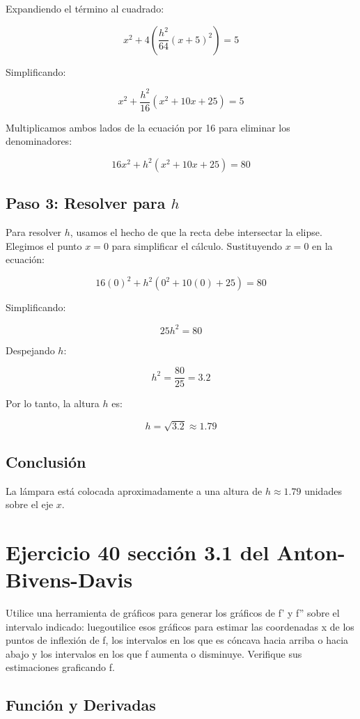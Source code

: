 \documentclass[11pt,letterpaper]{article}
\begin{document}
Expandiendo el término al cuadrado:

\[
x^2 + 4\left( \frac{h^2}{64}(x + 5)^2 \right) = 5
\]

Simplificando:

\[
x^2 + \frac{h^2}{16}(x^2 + 10x + 25) = 5
\]

Multiplicamos ambos lados de la ecuación por 16 para eliminar los denominadores:

\[
16x^2 + h^2(x^2 + 10x + 25) = 80
\]

\subsection*{Paso 3: Resolver para \(h\)}

Para resolver \(h\), usamos el hecho de que la recta debe intersectar la elipse. Elegimos el punto \(x = 0\) para simplificar el cálculo. Sustituyendo \(x = 0\) en la ecuación:

\[
16(0)^2 + h^2(0^2 + 10(0) + 25) = 80
\]

Simplificando:

\[
25h^2 = 80
\]

Despejando \(h\):

\[
h^2 = \frac{80}{25} = 3.2
\]

Por lo tanto, la altura \(h\) es:

\[
h = \sqrt{3.2} \approx 1.79
\]

\subsection*{Conclusión}

La lámpara está colocada aproximadamente a una altura de \(h \approx 1.79\) unidades sobre el eje \(x\).

\section*{Ejercicio 40 sección 3.1 del Anton-Bivens-Davis}

Utilice una herramienta de gráficos para generar los gráficos de f' y f'' sobre el intervalo indicado: luegoutilice esos gráficos para estimar las coordenadas x de los puntos de inflexión de f, los intervalos en los que es cóncava hacia arriba o hacia abajo y los intervalos en los que f aumenta o disminuye. Verifique sus estimaciones graficando f.

\subsection*{Función y Derivadas}
\end{document}
